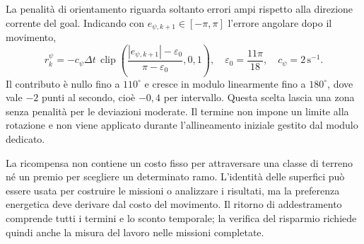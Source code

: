 La penalità di orientamento riguarda soltanto errori ampi rispetto alla direzione corrente del goal. Indicando con $e_{\psi,k+1}\in[-\pi,\pi]$ l'errore angolare dopo il movimento,
\begin{equation}
    r_k^{\psi}=-c_{\psi}\Delta t\,
        \operatorname{clip}\left(
           \frac{|e_{\psi,k+1}|-\varepsilon_0}{\pi-\varepsilon_0},0,1
        \right),
    \quad \varepsilon_0=\frac{11\pi}{18},\quad c_{\psi}=2\,\mathrm{s}^{-1}.
    \label{eq:metodo-penalita-orientamento}
\end{equation}
Il contributo è nullo fino a $110^\circ$ e cresce in modulo linearmente fino a $180^\circ$, dove vale $-2$ punti al secondo, cioè $-0{,}4$ per intervallo. Questa scelta lascia una zona senza penalità per le deviazioni moderate. Il termine non impone un limite alla rotazione e non viene applicato durante l'allineamento iniziale gestito dal modulo dedicato.

\begin{table}[tbp]
    \centering
    \caption[Termini e coefficienti della ricompensa]{Componenti della ricompensa e parametri adottati nei diversi scenari. Il costo dipende dal lavoro articolare misurato, senza una penalità assegnata direttamente all'identità o al colore del terreno.}
    \label{tab:metodo-ricompensa}
\end{table}

La ricompensa non contiene un costo fisso per attraversare una classe di terreno né un premio per scegliere un determinato ramo. L'identità delle superfici può essere usata per costruire le missioni o analizzare i risultati, ma la preferenza energetica deve derivare dal costo del movimento. Il ritorno di addestramento comprende tutti i termini e lo sconto temporale; la verifica del risparmio richiede quindi anche la misura del lavoro nelle missioni completate.

